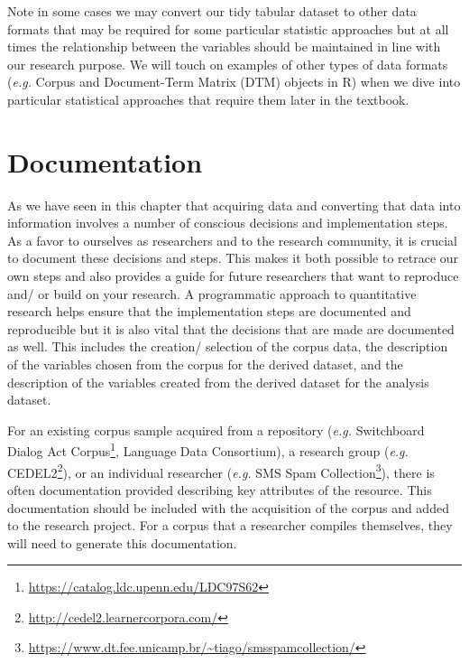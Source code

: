 \documentclass[
  letterpaper,
]{scrbook}
\DeclareRobustCommand{\href}[2]{#2\footnote{\url{#1}}}
\begin{document}
\begin{tcolorbox}[enhanced jigsaw, title=\textcolor{quarto-callout-warning-color}{\faExclamationTriangle}\hspace{0.5em}{Tip}, titlerule=0mm, toptitle=1mm, colbacktitle=quarto-callout-warning-color!10!white, bottomtitle=1mm, left=2mm, colframe=quarto-callout-warning-color-frame, breakable, toprule=.15mm, colback=white, opacitybacktitle=0.6, leftrule=.75mm, rightrule=.15mm, bottomrule=.15mm, arc=.35mm, coltitle=black, opacityback=0]

Note in some cases we may convert our tidy tabular dataset to other data
formats that may be required for some particular statistic approaches
but at all times the relationship between the variables should be
maintained in line with our research purpose. We will touch on examples
of other types of data formats (\emph{e.g.} Corpus and Document-Term
Matrix (DTM) objects in R) when we dive into particular statistical
approaches that require them later in the textbook.

\end{tcolorbox}

\hypertarget{documentation}{%
\section{Documentation}\label{documentation}}

As we have seen in this chapter that acquiring data and converting that
data into information involves a number of conscious decisions and
implementation steps. As a favor to ourselves as researchers and to the
research community, it is crucial to document these decisions and steps.
This makes it both possible to retrace our own steps and also provides a
guide for future researchers that want to reproduce and/ or build on
your research. A programmatic approach to quantitative research helps
ensure that the implementation steps are documented and reproducible but
it is also vital that the decisions that are made are documented as
well. This includes the creation/ selection of the corpus data, the
description of the variables chosen from the corpus for the derived
dataset, and the description of the variables created from the derived
dataset for the analysis dataset.

For an existing corpus sample acquired from a repository (\emph{e.g.}
\href{https://catalog.ldc.upenn.edu/LDC97S62}{Switchboard Dialog Act
Corpus}, Language Data Consortium), a research group (\emph{e.g.}
\href{http://cedel2.learnercorpora.com/}{CEDEL2}), or an individual
researcher (\emph{e.g.}
\href{https://www.dt.fee.unicamp.br/~tiago/smsspamcollection/}{SMS Spam
Collection}), there is often documentation provided describing key
attributes of the resource. This documentation should be included with
the acquisition of the corpus and added to the research project. For a
corpus that a researcher compiles themselves, they will need to generate
this documentation.
\end{document}
